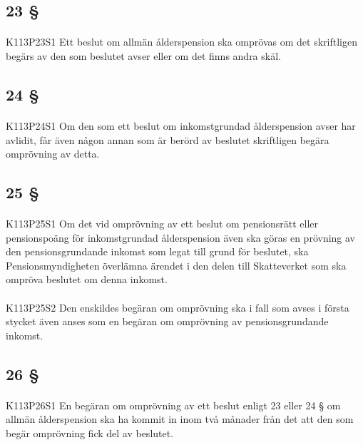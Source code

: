 \documentclass[a4paper,notitlepage,openany,10pt]{book}
\begin{document}
\subsection*{23 §}
\paragraph*{}
{\tiny K113P23S1}
Ett beslut om allmän ålderspension ska omprövas om det skriftligen begärs av den som beslutet avser eller om det finns andra skäl.
\subsection*{24 §}
\paragraph*{}
{\tiny K113P24S1}
Om den som ett beslut om inkomstgrundad ålderspension avser har avlidit, får även någon annan som är berörd av beslutet skriftligen begära omprövning av detta.
\subsection*{25 §}
\paragraph*{}
{\tiny K113P25S1}
Om det vid omprövning av ett beslut om pensionsrätt eller pensionspoäng för inkomstgrundad ålderspension även ska göras en prövning av den pensionsgrundande inkomst som legat till grund för beslutet, ska Pensionsmyndigheten överlämna ärendet i den delen till Skatteverket som ska ompröva beslutet om denna inkomst.
\paragraph*{}
{\tiny K113P25S2}
Den enskildes begäran om omprövning ska i fall som avses i första stycket även anses som en begäran om omprövning av pensionsgrundande inkomst.
\subsection*{26 §}
\paragraph*{}
{\tiny K113P26S1}
En begäran om omprövning av ett beslut enligt 23 eller 24 § om allmän ålderspension ska ha kommit in inom två månader från det att den som begär omprövning fick del av beslutet.
\end{document}
